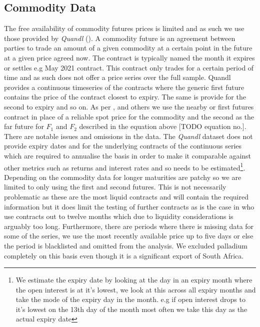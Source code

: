 \subsection{Commodity Data}
The free availability of commodity futures prices is limited and as such we use those provided by \textit{Quandl} (\cite{quandl}). A commodity future is an agreement between parties to trade an amount of a given commodity at a certain point in the future at a given price agreed now. The contract is typically named the month it expires or settles e.g May 2021 contract. This contract only trades for a certain period of time and as such does not offer a price series over the full sample. Quandl provides a continuous timeseries of the contracts where the generic first future contains the price of the contract closest to expiry. The same is provide for the second to expiry and so on. As per \cite{gorton2007}, \cite{famafrench} and others we use the nearby or first futures contract in place of a reliable spot price for the commodity and the second as the far future for $F_1$ and $F_2$ described in the equation above [TODO equation no.]. There are notable issues and omissions in the data. The \textit{Quandl} dataset does not provide expiry dates and for the underlying contracts of the continuous series which are required to annualise the basis in order to make it comparable against other metrics such as returns and interest rates and so needs to be estimated\footnote{We estimate the expiry date by looking at the day in an expiry month where the open interest is at it's lowest, we look at this across all expiry months and take the mode of the expiry day in the month. e.g if open interest drops to it's lowest on the 13th day of the month most often we take this day as the actual expiry date}. Depending on the commodity data for longer maturities are patchy so we are limited to only using the first and second futures. This is not necessarily problematic as these are the most liquid contracts and will contain the required information but it does limit the testing of further contracts as is the case in \cite{mainref} who use contracts out to twelve months which due to liquidity considerations is arguably too long. Furthermore, there are periods where there is missing data for some of the series, we use the most recently available price up to five days or else the period is blacklisted and omitted from the analysis. We excluded palladium completely on this basis even though it is a significant export of South Africa.

